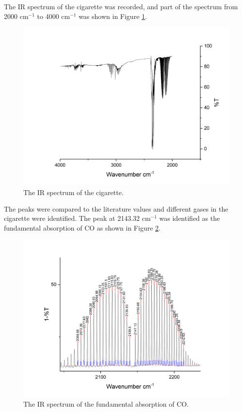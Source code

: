 \documentclass[twocolumn]{article} %
\begin{document}
\vspace{0.3in}

The IR spectrum of the cigarette was recorded, and part of the spectrum from 2000 cm$^{-1}$ to 4000 cm$^{-1}$ was shown in Figure \ref{cigall}.

\begin{figure}[h!]
    \centering
    \includegraphics[width=\columnwidth]{Cig-all.png}
    \caption{The IR spectrum of the cigarette.}
    \label{cigall}
\end{figure}
\vspace{0.4in}

The peaks were compared to the literature values and different gases in the cigarette were identified. The peak at 2143.32 cm$^{-1}$ was identified as the fundamental absorption of CO as shown in Figure \ref{COfund}.

\begin{figure}[h!]
    \centering
    \includegraphics[width=\columnwidth]{CO-fundation.2.png}
    \caption{The IR spectrum of the fundamental absorption of CO.}
    \label{COfund}
\end{figure}
\vspace{0.4in}
\end{document}

